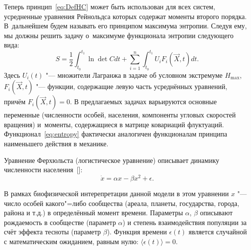 Теперь принцип~\eqref{eq:DefHC}  может быть использован для всех систем, усредненные уравнения Рейнольдса которых содержат моменты второго порядка.  
В~дальнейшем будем называть его принципом максимума энтропии. 
Следуя ему, мы должны решить задачу о~максимуме функционала энтропии следующего вида:
\begin{equation}
         S = \frac{1}{2}\int _{t_0}^{t_1} \ln\det C dt
        + \sum_{i=1}^n \int _{t_0}^{t_1} U_i F_i(\vec X,t)dt. \label{eq:entropy}
    \end{equation}
Здесь $U_i(t)$ "--- множители Лагранжа в задаче об условном     экстремуме $H_{\max}$, $F_i(\vec X,t)$ "--- функции, содержащие левую часть усреднённых уравнений, причём
$
F_i(\vec X,t)=0.
$
В предлагаемых задачах варьируются основные переменные (численности особей, населения, компоненты угловых скоростей
вращения) и~моменты, содержащиеся в матрице ковариаций флуктуаций. 
Функционал~\eqref{eq:entropy} фактически аналогичен функционалам принципа наименьшего действия в механике.

\smallskip

 Уравнение Ферхюльста (логистическое уравнение) описывает динамику
численности населения~[]:
\begin{equation}
\dot{x} = \alpha x - \beta x^2 + \epsilon.       \label{eq:verhulst}
\end{equation}

В рамках биофизической интерепретации данной модели в этом уравнении $x$ "--- число особей какого"=либо сообщества (ареала, планеты, государства, города, района и т.д.) в определённый момент времени.
Параметры $\alpha$, $\beta$ описывают рождаемость в сообществе (параметр $\alpha$) и степень взаимодействия популяции за счёт эффекта тесноты (параметр $\beta$). 
Функция времени $\epsilon(t)$ является случайной с математическим ожиданием, равным нулю:
$\langle\epsilon(t)\rangle=0$.

